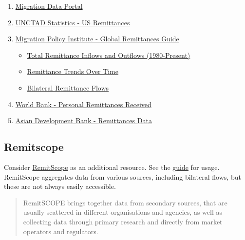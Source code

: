 \documentclass[
  11pt,
]{article}
\providecommand{\tightlist}{%
  \setlength{\itemsep}{0pt}\setlength{\parskip}{0pt}}
\begin{document}
\begin{enumerate}
\def\labelenumi{\arabic{enumi}.}
\tightlist
\item
  \href{https://www.migrationdataportal.org/data-catalogue}{Migration
  Data Portal}
\item
  \href{https://unctadstat.unctad.org/datacentre/reportInfo/US.Remittances}{UNCTAD
  Statistics - US Remittances}
\item
  \href{https://www.migrationpolicy.org/programs/data-hub/global-remittances-guide}{Migration
  Policy Institute - Global Remittances Guide}

  \begin{itemize}
  \tightlist
  \item
    \href{https://www.migrationpolicy.org/programs/data-hub/charts/total-remittance-inflows-and-outflows-1980-present?width=1000&height=850&iframe=true}{Total
    Remittance Inflows and Outflows (1980-Present)}
  \item
    \href{https://www.migrationpolicy.org/programs/data-hub/charts/remittance-trends-over-time?width=1000&height=850&iframe=true}{Remittance
    Trends Over Time}
  \item
    \href{https://www.migrationpolicy.org/programs/data-hub/charts/bilateral-remittance-flows?width=1000&height=850&iframe=true}{Bilateral
    Remittance Flows}
  \end{itemize}
\item
  \href{https://data.worldbank.org/indicator/bx.trf.pwkr.cd.dt}{World
  Bank - Personal Remittances Received}
\item
  \href{https://data.adb.org/taxonomy/term/130}{Asian Development Bank -
  Remittances Data}
\end{enumerate}

\subsection{Remitscope}\label{remitscope}

Consider \href{https://remitscope.org/latin-america/themes/}{RemitScope}
as an additional resource. See the
\href{https://remitscope.org/how-to-use-remitscope/}{guide} for usage.
RemitScope aggregates data from various sources, including bilateral
flows, but these are not always easily accessible.

\begin{quote}
RemitSCOPE brings together data from secondary sources, that are usually
scattered in different organisations and agencies, as well as collecting
data through primary research and directly from market operators and
regulators.
\end{quote}
\end{document}
